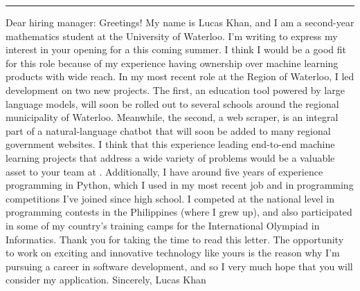 \documentclass[12pt]{article}
\newcommand{\companyname}{}
\newcommand{\position}{}
\begin{document}
\begin{minipage}[t]{0.63\textwidth}
  \vspace{0pt}
  \rule{\linewidth}{3px} %
  \newline \newline
  Dear hiring manager:
  \newline \newline
  Greetings! My name is Lucas Khan, and I am a second-year mathematics student at the University of Waterloo. I’m writing to express my interest in your opening for a \position this coming summer.
  \newline \newline
  I think I would be a good fit for this role because of my experience having ownership over machine learning products with wide reach. In my most recent role at the Region of Waterloo, I led development on two new projects. The first, an education tool powered by large language models, will soon be rolled out to several schools around the regional municipality of Waterloo. Meanwhile, the second, a web scraper, is an integral part of a natural-language chatbot that will soon be added to many regional government websites. I think that this experience leading end-to-end machine learning projects that address a wide variety of problems would be a valuable asset to your team at \companyname.
  \newline \newline
  Additionally, I have around five years of experience programming in Python, which I used in my most recent job and in programming competitions I’ve joined since high school. I competed at the national level in programming contests in the Philippines (where I grew up), and also participated in some of my country’s training camps for the International Olympiad in Informatics.
  \newline \newline
  Thank you for taking the time to read this letter. The opportunity to work on exciting and innovative technology like yours is the reason why I’m pursuing a career in software development, and so I very much hope that you will consider my application.
  \newline \newline
  Sincerely,
  \newline \newline \newline \newline
  Lucas Khan
\end{minipage}
\end{document}
